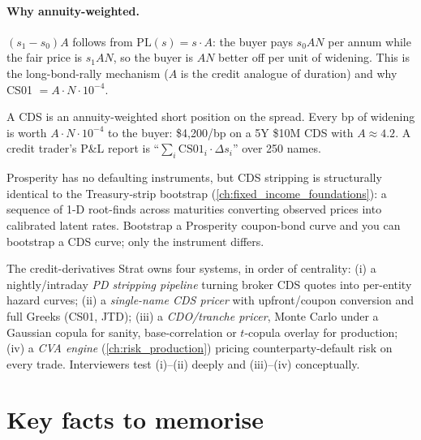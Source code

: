 \paragraph{Why annuity-weighted.}  $(s_1 - s_0)A$ follows from
$\mathrm{PL}(s) = s \cdot A$: the buyer pays $s_0 A N$ per annum
while the fair price is $s_1 A N$, so the buyer is $AN$ better off
per unit of widening.  This is the long-bond-rally mechanism ($A$
is the credit analogue of duration) and why CS01 $= A \cdot N
\cdot 10^{-4}$.

\begin{intuitionbox}
A CDS is an annuity-weighted short position on the spread.  Every
bp of widening is worth $A \cdot N \cdot 10^{-4}$ to the buyer:
\$4{,}200/bp on a 5Y \$10M CDS with $A \approx 4.2$.  A credit
trader's P\&L report is
``$\sum_i \text{CS01}_i \cdot \Delta s_i$'' over 250 names.
\end{intuitionbox}


\begin{prosperitybox}[title={Credit-curve stripping mirrors the zero-curve bootstrap}]
Prosperity has no defaulting instruments, but CDS stripping is
structurally identical to the Treasury-strip bootstrap
(\cref{ch:fixed_income_foundations}): a sequence of 1-D root-finds
across maturities converting observed prices into calibrated latent
rates.  Bootstrap a Prosperity coupon-bond curve and you can
bootstrap a CDS curve; only the instrument differs.
\end{prosperitybox}

\begin{gsbox}[title={The credit Strat's job description}]
The credit-derivatives Strat owns four systems, in order of
centrality: (i) a nightly/intraday \emph{PD stripping pipeline}
turning broker CDS quotes into per-entity hazard curves; (ii) a
\emph{single-name CDS pricer} with upfront/coupon conversion and
full Greeks (CS01, JTD); (iii) a \emph{CDO/tranche pricer}, Monte
Carlo under a Gaussian copula for sanity, base-correlation or
$t$-copula overlay for production; (iv) a \emph{CVA engine}
(\cref{ch:risk_production}) pricing counterparty-default risk on
every trade.  Interviewers test (i)--(ii) deeply and (iii)--(iv)
conceptually.
\end{gsbox}


\section{Key facts to memorise}
\label{sec:credit_summary}

